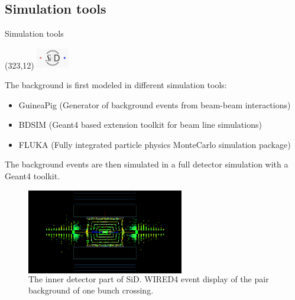 \documentclass[xcolor={dvipsnames}]{beamer}
\newcommand{\sidlogo}{
  \setlength{\TPHorizModule}{1pt}
  \setlength{\TPVertModule}{1pt}
  \begin{textblock}{1}(323,12)
   \includegraphics[width=40pt,height=26pt]{figures/SiD.jpeg}
  \end{textblock}
  }
\begin{document}
\subsection{Simulation tools}
\begin{frame}{Simulation tools}
\sidlogo
The background is first modeled in different simulation tools:\\
\begin{itemize}
\item \alert{GuineaPig} (Generator of background events from beam-beam interactions)
\item \alert{BDSIM} (Geant4 based extension toolkit for beam line simulations)
\item \alert{FLUKA} (Fully integrated particle physics MonteCarlo simulation package)
\end{itemize}
\vspace*{0.5cm}
The background events are then simulated in a \alert{full detector simulation} with a Geant4 toolkit.\\
\vspace*{0.2cm}
\begin{figure}
	\begin{columns}
         \flushright
        \includegraphics[width=0.61\textwidth]{figures/Full_bunchcrossing_rhoz.png}
        \caption{\small The inner detector part of SiD. WIRED4 event display of the pair background of one bunch crossing.}
      \end{columns}
\end{figure}
\end{frame}
\end{document}

